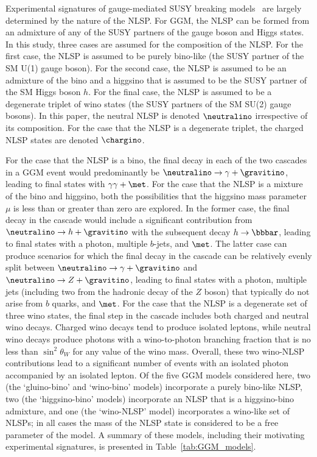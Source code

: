 Experimental signatures of gauge-mediated SUSY breaking
models~\cite{Dine:1981gu,AlvarezGaume:1981wy,Nappi:1982hm,Dine:1993yw, Dine:1994vc,Dine:1995ag}
are largely determined by the nature of the NLSP.
For GGM,
the NLSP can be formed from an admixture of any of the SUSY partners
of the gauge boson and Higgs states.
In this study, three cases are assumed for the
composition of the NLSP. For the first case, the NLSP is assumed to be
purely bino-like (the SUSY partner of the SM U(1) gauge boson). For the
second case, the NLSP is assumed to be an admixture
of the bino and a higgsino that is assumed to be the SUSY partner
of the SM Higgs boson $h$. For the final
case, the NLSP is assumed to be a degenerate triplet
of wino states (the SUSY partners of the SM SU(2) gauge bosons).
In this paper, the neutral NLSP is denoted $\neutralino$ irrespective
of its composition. For the case that
the NLSP is a degenerate triplet, the charged NLSP states are denoted $\chargino$.

For the case that the NLSP is a bino,
the final decay in each of the two cascades in a GGM event would predominantly be
$\neutralino\to\gamma+\gravitino$, leading
to final states with $\gamma\gamma+\met$.
For the case that the NLSP is a mixture of the bino
and higgsino, both the possibilities that the higgsino mass
parameter $\mu$ is less than or greater than zero are explored.
In the former case, the final decay in the cascade would include
a significant contribution from $\neutralino\to h + \gravitino$
with the subsequent decay $h \to \bbbar$, leading to final
states with a photon, multiple $b$-jets, and $\met$.
The latter case can produce scenarios for which the
final decay in the cascade can be relatively evenly split
between $\neutralino\to\gamma+\gravitino$ and
$\neutralino\to Z + \gravitino$, leading to final states with
a photon, multiple jets (including two from the hadronic decay of the $Z$ boson)
that typically do not arise from $b$ quarks,
and $\met$.
For the case that the NLSP is a degenerate set of three wino states,
the final step in the cascade includes both charged and neutral wino decays.
Charged wino decays tend to produce isolated
leptons, while neutral wino decays produce photons with a wino-to-photon
branching fraction that is no less than $\sin^2 \theta_W$ for any value of
the wino mass. Overall, these two wino-NLSP contributions lead to a significant
number of events with an isolated photon accompanied by an isolated lepton.
Of the five %
GGM models considered here, two (the `gluino-bino' and `wino-bino' models) %
incorporate a purely bino-like NLSP, two (the `higgsino-bino' models)    %
incorporate an NLSP that is a higgsino-bino admixture, and one (the `wino-NLSP' model)
incorporates a wino-like set of NLSPs; in all cases
the mass of the NLSP state is considered to be a free parameter
of the model.
A summary of these models,
including their motivating experimental signatures, is presented in Table~\ref{tab:GGM_models}.

